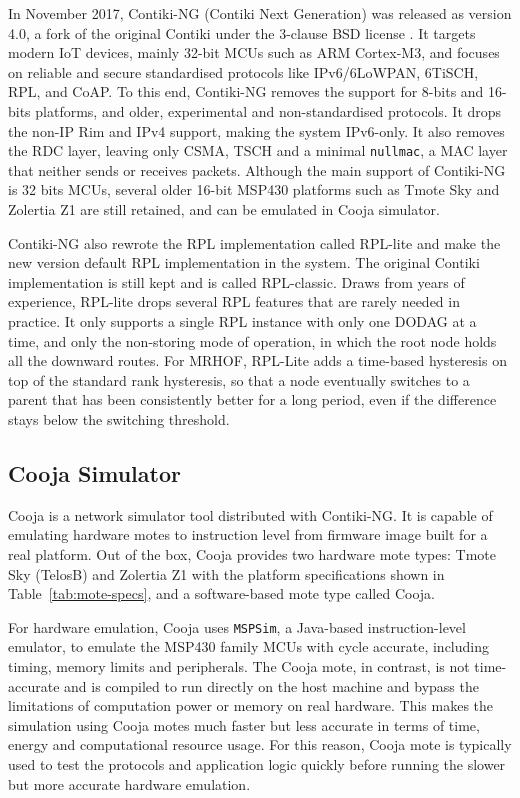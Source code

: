 In November 2017, Contiki-NG (Contiki Next Generation) was released
as version 4.0, a fork of the original Contiki under the 3-clause BSD
license \cite{ContikiNG}. It targets modern IoT devices,
mainly 32-bit MCUs such as ARM Cortex-M3, and focuses on reliable and
secure standardised protocols like IPv6/6LoWPAN, 6TiSCH, RPL, and CoAP.
To this end, Contiki-NG removes the support for 8-bits and 16-bits
platforms, and older, experimental and non-standardised protocols. It
drops the non-IP Rim and IPv4 support, making the system IPv6-only.
It also removes the RDC layer, leaving only CSMA, \ieeemacE{} TSCH
and a minimal \texttt{nullmac}, a MAC layer that neither sends or
receives packets.
Although the main support of Contiki-NG is 32 bits MCUs, several older 16-bit
MSP430 platforms such as Tmote Sky and Zolertia Z1 are still
retained, and can be emulated in Cooja simulator.

Contiki-NG also rewrote the RPL implementation called RPL-lite and
make the new version default RPL implementation in the system.
The original Contiki implementation is still kept and is called RPL-classic.
Draws from years of experience, RPL-lite drops several RPL features
that are rarely needed in practice.
It only supports a single RPL instance with only one DODAG at a time, and
only the non-storing mode of operation, in which the root node holds
all the downward routes.
For MRHOF, RPL-Lite adds a time-based hysteresis on top of the
standard rank hysteresis, so that a node eventually switches to a
parent that has been consistently better for a long period, even if
the difference stays below the switching threshold.

\subsection{Cooja Simulator}
Cooja is a network simulator tool distributed with Contiki-NG. It is
capable of emulating hardware motes to instruction level from
firmware image built for a real platform.
Out of the box, Cooja provides two hardware mote types: Tmote Sky
(TelosB) and Zolertia Z1 with the platform specifications shown in
Table~\ref{tab:mote-specs}, and a software-based mote type called Cooja.

For hardware emulation, Cooja uses \texttt{MSPSim}, a Java-based
instruction-level emulator, to emulate the MSP430 family MCUs with
cycle accurate, including timing, memory limits and peripherals.
The Cooja mote, in contrast, is not time-accurate and is compiled to
run directly on the host
machine and bypass the limitations of computation power or memory on
real hardware. This makes the simulation using Cooja motes much
faster but less accurate in terms of time, energy and computational
resource usage. For this reason, Cooja mote is typically used to test
the protocols and
application logic quickly before running the slower but more accurate
hardware emulation.

